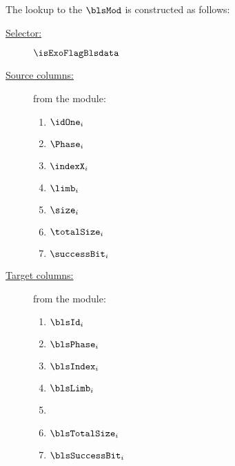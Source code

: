 The lookup to the $\blsMod$ is constructed as follows:
\begin{description}
	\item[\underline{Selector:}] $\isExoFlagBlsdata$
	\item[\underline{Source columns:}] from the \mmioMod{} module:
		\begin{multicols}{3}
			\begin{enumerate}
				\item $\idOne_{i}$
				\item $\Phase_{i}$
				\item $\indexX_{i}$
				\item $\limb_{i}$
				\item $\size_{i}$
				\item $\totalSize_{i}$
				\item $\successBit_{i}$
			\end{enumerate}
		\end{multicols}
	\item[\underline{Target columns:}] from the \blsMod{} module: 
			\begin{multicols}{3}
				\begin{enumerate}
					\item $\blsId_{i}$
					\item $\blsPhase_{i}$
					\item $\blsIndex_{i}$
					\item $\blsLimb_{i}$
					\item {}
					\item $\blsTotalSize_{i}$
					\item $\blsSuccessBit_{i}$
				\end{enumerate}
			\end{multicols}
\end{description}